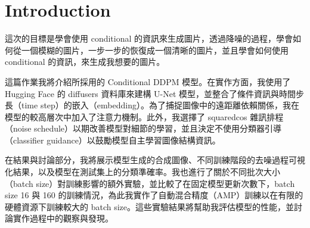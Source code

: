 \section{Introduction}


這次的目標是學會使用 conditional 的資訊來生成圖片，透過降噪的過程，學會如何從一個模糊的圖片，一步一步的恢復成一個清晰的圖片，並且學會如何使用 conditional 的資訊，來生成我想要的圖片。

這篇作業我將介紹所採用的 Conditional DDPM 模型。在實作方面，我使用了 Hugging Face 的 diffusers 資料庫來建構 U-Net 模型，並整合了條件資訊與時間步長（time step）的嵌入（embedding）。為了捕捉圖像中的遠距離依賴關係，我在模型的較高層次中加入了注意力機制。此外，我選擇了 squaredcos 雜訊排程（noise schedule）以期改善模型對細節的學習，並且決定不使用分類器引導（classifier guidance）以鼓勵模型自主學習圖像結構資訊。

在結果與討論部分，我將展示模型生成的合成圖像、不同訓練階段的去噪過程可視化結果，以及模型在測試集上的分類準確率。我也進行了關於不同批次大小（batch size）對訓練影響的額外實驗，並比較了在固定模型更新次數下，batch size 16 與 160 的訓練情況，為此我實作了自動混合精度（AMP）訓練以在有限的硬體資源下訓練較大的 batch size。這些實驗結果將幫助我評估模型的性能，並討論實作過程中的觀察與發現。

